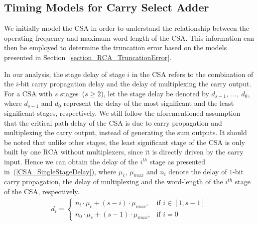 \documentclass[journal]{IEEEtran}
\begin{document}



\subsection{Timing Models for Carry Select Adder}
We initially model the CSA in order to understand the relationship between the operating frequency and maximum word-length of the CSA. This information can then be employed to determine the truncation error based on the models presented in Section~\ref{section_RCA_TruncationError}.


In our analysis, the stage delay of stage $i$ in the CSA refers to the combination of the $i$-bit carry propagation delay and the delay of multiplexing the carry output. For a CSA with $s$ stages~($s\geqslant 2$), let the stage delay be denoted by $d_{s-1},~\dots,~d_{0}$, where $d_{s-1}$ and $d_{0}$ represent the delay of the most significant and the least significant stages, respectively. We still follow the aforementioned assumption that the critical path delay of the CSA is due to carry propagation and multiplexing the carry output, instead of generating the sum outputs. It should be noted that unlike other stages, the least significant stage of the CSA is only built by one RCA without multiplexers, since it is directly driven by the carry input. Hence we can obtain the delay of the $i^{th}$ stage as presented in~(\ref{CSA_SingleStageDelay}), where $\mu_{c}$, $\mu_{mux}$ and $n_i$ denote the delay of $1$-bit carry propagation, the delay of multiplexing and the word-length of the $i^{th}$ stage of the CSA, respectively.
\begin{eqnarray}\label{CSA_SingleStageDelay}
  d_i=\left\{
    \begin{matrix}
      n_i\cdot \mu_{c}+(s-i)\cdot\mu_{mux}, &\textrm{if $i\in\left[1,s-1\right]$}\\
      n_0\cdot \mu_c + (s-1)\cdot\mu_{mux}, & \textrm{if $i=0$}
    \end{matrix}
  \right.
\end{eqnarray}
\end{document}
